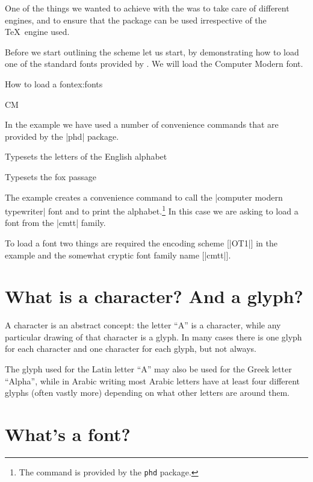 One of the things we wanted to achieve with the  was  to take care of different \tex engines, and to ensure that the package can be used irrespective of the \TeX\ engine used. 

Before we start outlining the scheme let us start, by demonstrating how to load one of the standard fonts provided by \latexe. We will load the Computer Modern font. 

\begin{texexample}{How to load a font}{ex:fonts}
\newcommand{\fontdemo}[4][OT1]{%
    \textcolor{thefontname}{#2}%
    \fontencoding{#1}\fontfamily{#3}\selectfont#4\\ }

\fontdemo{CM}{cmtt}{\ttfamily\alphabet}

\fox
\end{texexample}

In the example we have used a number of convenience commands that are provided by the |phd| package.

\CMDI{\alphabet} Typesets the letters of the English alphabet

\CMDI{\fox} Typesets the fox passage

The example  creates a convenience command to call the |computer modern typewriter| font and to print the alphabet.\footnote{The command  is provided by the \texttt{phd} package.} In this case we are asking \latex to load a font from the |cmtt| family. 

To load a font two things are required the encoding scheme [|OT1|] in the example and the somewhat cryptic font family name [|cmtt|].

\section{What is a character? And a glyph?}

A character is an abstract
concept: the letter “A” is a character, while any
particular drawing of that character is a glyph. In many
cases there is one glyph for each character and one character
for each glyph, but not always.

The glyph used for the Latin letter “A” may also be
used for the Greek letter “Alpha”, while in Arabic writing
most Arabic letters have at least four different glyphs
(often vastly more) depending on what other letters are
around them.

\section{What’s a font?}

